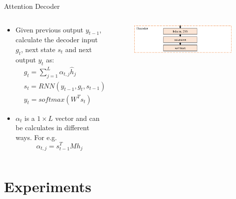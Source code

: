 \documentclass[compress]{beamer}
\begin{document}
\begin{frame}{Attention Decoder}
    \begin{columns}
        \begin{column}[T]{.55\textwidth}
            \begin{itemize}
                \item Given previous output $y_{t-1}$, calculate the decoder input $g_t$, next state $s_t$ and next output $y_t$ as:
                    \begin{align*}
                        & g_t = \sum_{j=1}^L \alpha_{t,j} \widehat{h}_j \\
                        & s_t = RNN(y_{t-1},g_t,s_{t-1}) \\
                        & y_t = softmax(W^Ts_t)
                    \end{align*}
                \item $\alpha_t$ is a $1\times L$ vector and can be calculates in different ways. For e.g.
                    \begin{equation*}
                        \alpha_{t,j} = s_{t-1}^T M h_j
                    \end{equation*}
            \end{itemize}
        \end{column}
        \begin{column}[T]{.45\textwidth}
            \begin{figure}
                \includegraphics[width=\textwidth,height=.3\textheight]{decoder}
            \end{figure}
        \end{column}
    \end{columns}
\end{frame}

\section{Experiments}
\end{document}
